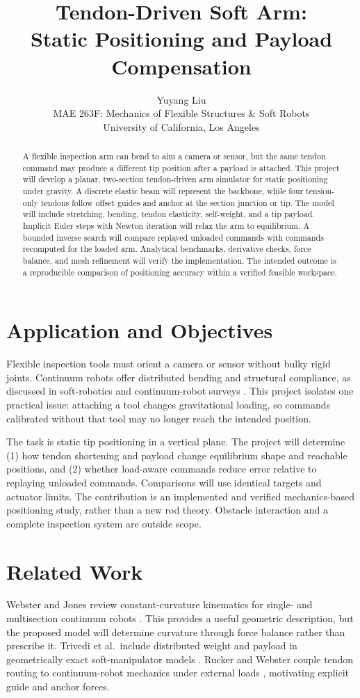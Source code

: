\documentclass[letterpaper,10pt,conference]{ieeeconf}
\title{\LARGE\bf Tendon-Driven Soft Arm:\\Static Positioning and Payload Compensation}
\author{Yuyang Liu\\MAE 263F: Mechanics of Flexible Structures \& Soft Robots\\
University of California, Los Angeles}
\begin{document}
\maketitle
\thispagestyle{empty}
\pagestyle{empty}

\begin{abstract}
A flexible inspection arm can bend to aim a camera or sensor, but the
same tendon command may produce a different tip position after a payload
is attached. This project will develop a planar, two-section
tendon-driven arm simulator for static positioning under gravity.
A discrete elastic beam will represent the backbone, while four
tension-only tendons follow offset guides and anchor at the section
junction or tip. The model will include stretching, bending, tendon
elasticity, self-weight, and a tip payload. Implicit Euler steps with
Newton iteration will relax the arm to equilibrium. A bounded inverse
search will compare replayed unloaded commands with commands recomputed
for the loaded arm. Analytical benchmarks, derivative checks, force
balance, and mesh refinement will verify the implementation. The intended
outcome is a reproducible comparison of positioning accuracy within a
verified feasible workspace.
\end{abstract}

\section{Application and Objectives}
Flexible inspection tools must orient a camera or sensor without bulky
rigid joints. Continuum robots offer distributed bending and structural
compliance, as discussed in soft-robotics and continuum-robot surveys
\cite{rus,burgner}. This project isolates one practical issue: attaching
a tool changes gravitational loading, so commands calibrated without
that tool may no longer reach the intended position.

The task is static tip positioning in a vertical plane. The project
will determine (1) how tendon shortening and payload change equilibrium
shape and reachable positions, and (2) whether load-aware commands reduce
error relative to replaying unloaded commands. Comparisons will use
identical targets and actuator limits. The contribution is an implemented
and verified mechanics-based positioning study, rather than a new rod
theory. Obstacle interaction and a complete inspection system are
outside scope.

\section{Related Work}
Webster and Jones review constant-curvature kinematics for single- and
multisection continuum robots \cite{webster}. This provides a useful
geometric description, but the proposed model will determine curvature
through force balance rather than prescribe it. Trivedi et al.\ include
distributed weight and payload in geometrically exact soft-manipulator
models \cite{trivedi}. Rucker and Webster couple tendon routing to
continuum-robot mechanics under external loads \cite{rucker},
motivating explicit guide and anchor forces.
\end{document}
